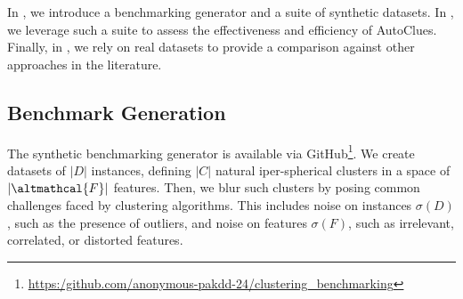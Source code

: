 
In , we introduce a benchmarking generator and a suite of synthetic datasets. In , we leverage such a suite to assess the effectiveness and efficiency of AutoClues.
Finally, in , we rely on real datasets to provide a comparison against other approaches in the literature.

\vspace{-0.2cm}
\subsection{Benchmark Generation}
\label{clustering-ssec:benchmark}
The synthetic benchmarking generator is available via GitHub\footnote{\url{https:/github.com/anonymous-pakdd-24/clustering_benchmarking}}.
We create datasets of $|D|$ instances, defining $|C|$ natural iper-spherical clusters in a space of $|\altmathcal{F}|$ features.
Then, we blur such clusters by posing common challenges faced by clustering algorithms.
This includes noise on instances $\sigma(D)$, such as the presence of outliers, and
noise on features $\sigma(F)$, such as irrelevant, correlated, or distorted features.

